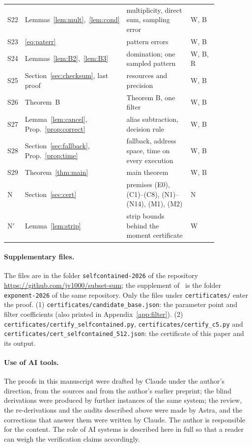 \documentclass[11pt]{article}
\theoremstyle{definition}
\begin{document}
\begin{center}
\begin{longtable}{lp{0.27\linewidth}p{0.40\linewidth}p{0.18\linewidth}}
S22 & Lemmas~\ref{lem:mult},~\ref{lem:cond} & multiplicity, direct sum, sampling error & W, B\\
S23 & \eqref{eq:paterr} & pattern errors & W, B\\
S24 & Lemmas~\ref{lem:B2},~\ref{lem:B3} & domination; one sampled pattern & W, B, R\\
S25 & Section~\ref{sec:checksum}, last proof & resources and precision & W, B\\
S26 & Theorem~B & Theorem B, one filter & W, B\\
S27 & Lemma~\ref{lem:cancel}, Prop.~\ref{prop:correct} & alias subtraction, decision rule & W, B\\
S28 & Section~\ref{sec:fallback}, Prop.~\ref{prop:time} & fallback, address space, time on every execution & W, B\\
S29 & Theorem~\ref{thm:main} & main theorem & W, B\\
N & Section~\ref{sec:cert} & premises (E0), (C1)--(C8), (N1)--(N14), (M1), (M2) & N\\
N$'$ & Lemma~\ref{lem:strip} & strip bounds behind the moment certificate & W\\
\bottomrule
\end{longtable}
\end{center}

\paragraph{Supplementary files.} The files are in the folder \texttt{selfcontained-2026} of the repository
\url{https://github.com/jv1000/subset-sum}; the supplement of~\cite{V} is the folder \texttt{exponent-2026} of the
same repository. Only the files under \texttt{certificates/} enter the proof.
(1) \texttt{certificates/candidate\_base.json}: the parameter point and filter
coefficients (also printed in Appendix~\ref{app:filter}).
(2) \texttt{certificates/certify\_selfcontained.py}, \texttt{certificates/certify\_c5.py} and
\texttt{certificates/cert\_selfcontained\_512.json}: the certificate of this paper and its output.

\paragraph{Use of AI tools.} The proofs in this manuscript were drafted by Claude under the author's
direction, from the sources and from the author's earlier preprint; the blind derivations were produced by further
instances of the same system; the review, the re-derivations and the audits described above were made by Astra, and the
corrections that answer them were written by Claude. The author is responsible for the
content. The role of AI systems is described here
in full so that a reader can weigh the verification claims accordingly.
\end{document}
